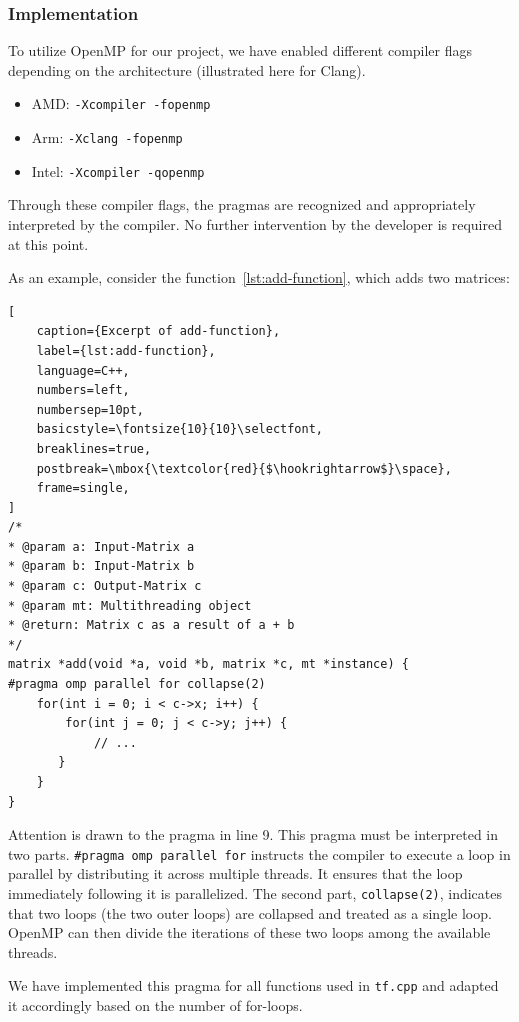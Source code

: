 \documentclass[modern,longauthor]{aastex7}
\begin{document}
\subsubsection{Implementation}
To utilize OpenMP for our project, we have enabled different compiler flags depending on the architecture (illustrated here for Clang).

\begin{itemize}
    \item AMD: \texttt{-Xcompiler -fopenmp}
    \item Arm: \texttt{-Xclang -fopenmp}
    \item Intel: \texttt{-Xcompiler -qopenmp}
\end{itemize}

Through these compiler flags, the pragmas are recognized and appropriately interpreted by the compiler. No further intervention by the developer is required at this point.

As an example, consider the function~\ref{lst:add-function}, which adds two matrices:

\newpage
\begin{lstlisting}[
    caption={Excerpt of add-function},
    label={lst:add-function},
    language=C++,
    numbers=left,
    numbersep=10pt,
    basicstyle=\fontsize{10}{10}\selectfont,
    breaklines=true,
    postbreak=\mbox{\textcolor{red}{$\hookrightarrow$}\space},
    frame=single,
]
/*
* @param a: Input-Matrix a
* @param b: Input-Matrix b
* @param c: Output-Matrix c
* @param mt: Multithreading object
* @return: Matrix c as a result of a + b
*/
matrix *add(void *a, void *b, matrix *c, mt *instance) {
#pragma omp parallel for collapse(2)
    for(int i = 0; i < c->x; i++) {
        for(int j = 0; j < c->y; j++) {
            // ...
       }
    }
}
\end{lstlisting}

Attention is drawn to the pragma in line 9. This pragma must be interpreted in two parts. \texttt{\#pragma omp parallel for} instructs the compiler to execute a loop in parallel by distributing it across multiple threads. It ensures that the loop immediately following it is parallelized. The second part, \texttt{collapse(2)}, indicates that two loops (the two outer loops) are collapsed and treated as a single loop. OpenMP can then divide the iterations of these two loops among the available threads.

We have implemented this pragma for all functions used in \texttt{tf.cpp} and adapted it accordingly based on the number of for-loops.
\end{document}
